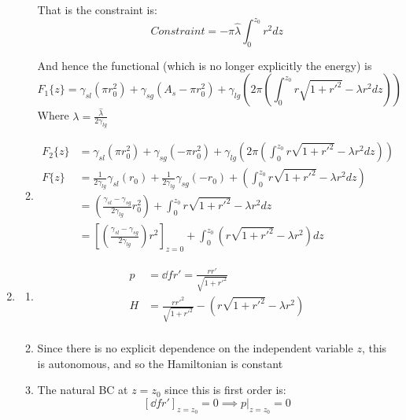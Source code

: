 \documentclass{X:/Documents/Coding/Latex/myassignment}
\begin{document}
\begin{enumerate}
\begin{enumerate}
	That is the constraint is: 
	\[Constraint = - \pi \hat{\lambda} \int_0^{z_0} r^2 dz\]

	And hence the functional (which is no longer explicitly the energy) is
	\[F_1\{z\} = \gamma_{sl}\left(\pi r_0^2\right) + \gamma_{sg}\left(A_s - \pi r_0^2\right) + \gamma_{lg}\left(2\pi \left( \int_{0}^{z_0} r\sqrt{1+r'^2} - \lambda r^2 dz\right)\right)\]
	Where $\lambda = \frac{\hat{\lambda}}{2 \gamma_{lg}}$
	\item 
	\begin{align*}		
		F_2\{z\} &=  \gamma_{sl}\left(\pi r_0^2\right) + \gamma_{sg}\left(- \pi r_0^2\right) + \gamma_{lg}\left(2\pi \left( \int_{0}^{z_0} r\sqrt{1+r'^2} - \lambda r^2 dz\right)\right)\\
		F\{z\} &=\frac{1}{2\gamma_{lg}}\gamma_{sl}\left(r_0\right) + \frac{1}{2\gamma_{lg}}\gamma_{sg}\left(- r_0\right) + \left(\int_{0}^{z_0} r\sqrt{1+r'^2} - \lambda r^2 dz\right)\\		
		&= \left(\frac{\gamma_{sl} - \gamma_{sg}}{2 \gamma_{lg}} r_0^2 \right) + \int_0^{z_0} r\sqrt{1+r'^2} - \lambda r^2 dz\\
		&= \left[\left(\frac{\gamma_{sl} - \gamma_{sg}}{2 \gamma_{lg}}  \right)r^2\right]_{z=0} + \int_0^{z_0}\left( r\sqrt{1+r'^2} - \lambda r^2\right) dz
	\end{align*}
\end{enumerate}
	\item 
\begin{enumerate}
	\item 
	\begin{align*}
		p &= \dd f{r'} = \frac{rr'}{\sqrt{1+r'^2}}\\
		H &= \frac{rr'^2}{\sqrt{1+r'^2}} - \left(r\sqrt{1+r'^2} - \lambda r^2\right)\\
	\end{align*}
	\item Since there is no explicit dependence on the independent variable $z$, this is autonomous, and so the Hamiltonian is constant

	\item The natural BC at $z=z_0$ since this is first order is:
	\[\left[\dd f{r'}\right]_{z =z_0} = 0 \implies p|_{z=z_0} = 0\]
	

\end{enumerate}
\end{enumerate}
\end{document}
